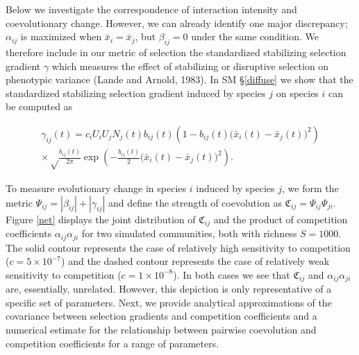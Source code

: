 \documentclass[]{elsarticle} %
\begin{document}
Below we investigate the correspondence of interaction intensity and
coevolutionary change. However, we can already identify one major
discrepancy; \(\alpha_{ij}\) is maximized when \(\bar x_i=\bar x_j\),
but \(\beta_{ij}=0\) under the same condition. We therefore include in
our metric of selection the standardized stabilizing selection gradient
\(\gamma\) which measures the effect of stabilizing or disruptive
selection on phenotypic variance (Lande and Arnold, 1983). In SM
\S\ref{diffuse} we show that the standardized stabilizing selection
gradient induced by species \(j\) on species \(i\) can be computed as

\begin{multline}
\gamma_{ij}(t)=c_iU_iU_jN_j(t)b_{ij}(t)\left(1-b_{ij}(t)\big(\bar x_i(t)-\bar x_j(t)\big)^2\right) \\
\times\sqrt\frac{b_{ij}(t)}{2\pi}\exp\left(-\frac{b_{ij}(t)}{2}\big(\bar x_i(t)-\bar x_j(t)\big)^2\right).
\end{multline}

To measure evolutionary change in species \(i\) induced by species
\(j\), we form the metric \(\Psi_{ij}=|\beta_{ij}|+|\gamma_{ij}|\) and
define the strength of coevolution as
\(\mathfrak{C}_{ij}=\Psi_{ij}\Psi_{ji}\). Figure \ref{net} displays the
joint distribution of \(\mathfrak{C}_{ij}\) and the product of
competition coefficients \(\alpha_{ij}\alpha_{ji}\) for two simulated
communities, both with richness \(S=1000\). The solid contour represents
the case of relatively high sensitivity to competition
(\(c=5\times10^{-7}\)) and the dashed contour represents the case of
relatively weak sensitivity to competition (\(c=1\times10^{-8}\)). In
both cases we see that \(\mathfrak{C}_{ij}\) and
\(\alpha_{ij}\alpha_{ji}\) are, essentially, unrelated. However, this
depiction is only representative of a specific set of parameters. Next,
we provide analytical approximations of the covariance between selection
gradients and competition coefficients and a numerical estimate for the
relationship between pairwise coevolution and competition coefficients
for a range of parameters.
\end{document}
